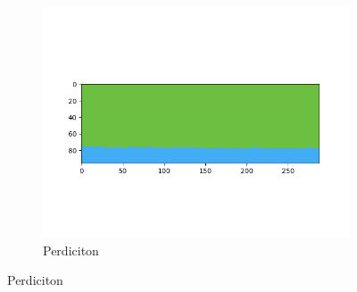 \documentclass[10pt,twocolumn,letterpaper]{article}
\begin{document}
\begin{figure}[hpt]
\begin{center}
\begin{subfigure}{0.3\textwidth}
  		\includegraphics[width=\linewidth,trim={1.25cm 1.5cm 1.5cm 1.25cm},clip]{perdiction4.png}
  		\caption{Perdiciton}
  \end{subfigure}
  

\end{center}
\end{figure}
\end{document}
